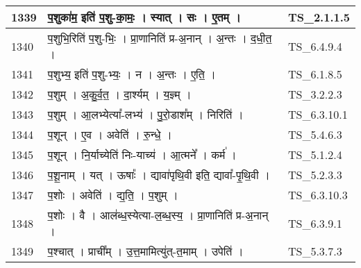 \documentclass[17pt]{extarticle}
\begin{document}
\begin{longtable}{||p{0.4in}||p{4.9in}||p{0.9in}||}
    \hline
        
    1339 & प॒शुका॑म॒ इति॑ प॒शु{-}का॒मः॒   ।   स्यात्   ।   सः   ।   ए॒तम्   ।    & TS\_2.1.1.5       \\
    
    \hline
        
    1340 & प॒शुभि॒रिति॑ प॒शु{-}भिः॒   ।   प्रा॒णानिति॑ प्र{-}अ॒नान्   ।   अ॒न्तः   ।   द॒धी॒त॒   ।    & TS\_6.4.9.4       \\
    
    \hline
        
    1341 & प॒शुभ्य॒ इति॑ प॒शु{-}भ्यः॒   ।   न   ।   अ॒न्तः   ।   ए॒ति॒   ।    & TS\_6.1.8.5       \\
    
    \hline
        
    1342 & प॒शुम्   ।   अ॒कु॒र्व॒त॒   ।   दा॒र्श्यम्   ।   य॒ज्ञ्म्   ।    & TS\_3.2.2.3       \\
    
    \hline
        
    1343 & प॒शुम्   ।   आ॒लभ्येत्या᳚{-}लभ्य॑   ।   पु॒रो॒डाश᳚म्   ।   निरिति॑   ।    & TS\_6.3.10.1       \\
    
    \hline
        
    1344 & प॒शून्   ।   ए॒व   ।   अवेति॑   ।   रु॒न्धे॒   ।    & TS\_5.4.6.3       \\
    
    \hline
        
    1345 & प॒शून्   ।   नि॒र्याच्येति॑ निः{-}याच्य॑   ।   आ॒त्मने᳚   ।   कर्म॑   ।    & TS\_5.1.2.4       \\
    
    \hline
        
    1346 & प॒शू॒नाम्   ।   यत्   ।   ऊषाः᳚   ।   द्यावा॑पृथि॒वी इति॒ द्यावा᳚{-}पृ॒थि॒वी   ।    & TS\_5.2.3.3       \\
    
    \hline
        
    1347 & प॒शोः   ।   अवेति॑   ।   द्य॒ति॒   ।   प॒शुम्   ।    & TS\_6.3.10.3       \\
    
    \hline
        
    1348 & प॒शोः   ।   वै   ।   आल॑ब्ध॒स्येत्या{-}ल॒ब्ध॒स्य॒   ।   प्रा॒णानिति॑ प्र{-}अ॒नान्   ।    & TS\_6.3.9.1       \\
    
    \hline
        
    1349 & प॒श्चात्   ।   प्राची᳚म्   ।   उ॒त्त॒मामित्यु॑त्{-}त॒माम्   ।   उपेति॑   ।    & TS\_5.3.7.3       \\
    

\end{longtable}
\end{document}
